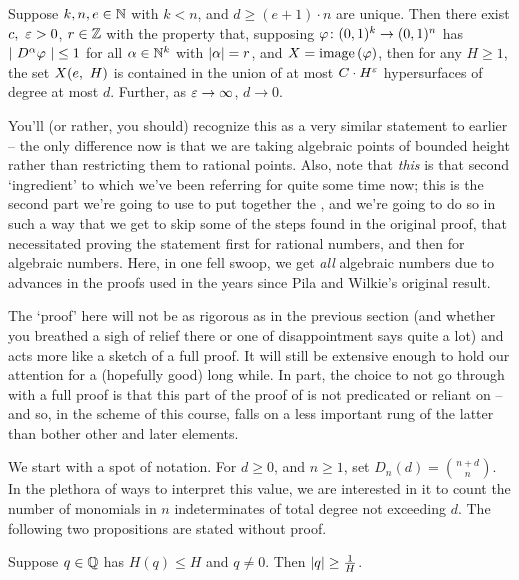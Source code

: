 \begin{proposition}
    Suppose $k, n, e \in \N$ with $k < n$, and $d \geq (e + 1) \cdot n$ are unique. Then there exist $c, \ \eps > 0$, $r \in \Z$ with the property that, supposing $\funcdom{\phi}{(0, 1)^k}{(0, 1)^n}$ has $\lvrv{D^{\alpha} \phi } \leq 1$ for all $\alpha \in \N^k$ with $\norm{\alpha} = r$, and $X = \image{\phi}$, then for any $H \geq 1$, the set $\XeH[H]{e}$ is contained in the union of at most $C \cdot H^{\eps}$ hypersurfaces of degree at most $d$. Further, as $\eps \to \infty$, $d \to 0$.
    \label{prop:dioph}
\end{proposition}

You'll (or rather, you should) recognize this as a very similar statement to earlier -- the only difference now is that we are taking algebraic points of bounded height rather than restricting them to rational points. Also, note that \emph{this} is that second `ingredient' to which we've been referring for quite some time now; this is the second part we're going to use to put together the \pwt, and we're going to do so in such a way that we get to skip some of the steps found in the original proof, that necessitated proving the statement first for rational numbers, and then for algebraic numbers. Here, in one fell swoop, we get \emph{all} algebraic numbers due to advances in the proofs used in the years since Pila and Wilkie's original result.

The `proof' here will not be as rigorous as in the previous section (and whether you breathed a sigh of relief there or one of disappointment says quite a lot) and acts more like a sketch of a full proof. It will still be extensive enough to hold our attention for a (hopefully good) long while. In part, the choice to not go through with a full proof is that this part of the proof of \pw is not predicated or reliant on \om -- and so, in the scheme of this course, falls on a less important rung of the latter than bother other and later elements.

We start with a spot of notation. For $d \geq 0$, and $n \geq 1$, set $D_n(d) = \binom{n+d}{n}$. In the plethora of ways to interpret this value, we are interested in it to count the number of monomials in $n$ indeterminates of total degree not exceeding $d$. The following two propositions are stated without proof.

\begin{proposition}
  Suppose $q \in \Q$ has $H(q) \leq H$ and $q \neq 0$. Then $\norm{q} \geq \frac{1}{H}$.
\end{proposition}

